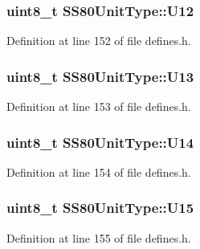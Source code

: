 \subsubsection[{\texorpdfstring{U12}{U12}}]{\setlength{\rightskip}{0pt plus 5cm}uint8\+\_\+t S\+S80\+Unit\+Type\+::\+U12}\hypertarget{structSS80UnitType_a03dbef211d4dfa850c9795ca4e60a104}{}\label{structSS80UnitType_a03dbef211d4dfa850c9795ca4e60a104}


Definition at line 152 of file defines.\+h.

\subsubsection[{\texorpdfstring{U13}{U13}}]{\setlength{\rightskip}{0pt plus 5cm}uint8\+\_\+t S\+S80\+Unit\+Type\+::\+U13}\hypertarget{structSS80UnitType_ac890c3734ea6988e504d71491d48f804}{}\label{structSS80UnitType_ac890c3734ea6988e504d71491d48f804}


Definition at line 153 of file defines.\+h.

\subsubsection[{\texorpdfstring{U14}{U14}}]{\setlength{\rightskip}{0pt plus 5cm}uint8\+\_\+t S\+S80\+Unit\+Type\+::\+U14}\hypertarget{structSS80UnitType_a885f26cbcfaf7b80ce64f069401fad7d}{}\label{structSS80UnitType_a885f26cbcfaf7b80ce64f069401fad7d}


Definition at line 154 of file defines.\+h.

\subsubsection[{\texorpdfstring{U15}{U15}}]{\setlength{\rightskip}{0pt plus 5cm}uint8\+\_\+t S\+S80\+Unit\+Type\+::\+U15}\hypertarget{structSS80UnitType_a088eee3da613c988c4f81c2ec57818de}{}\label{structSS80UnitType_a088eee3da613c988c4f81c2ec57818de}


Definition at line 155 of file defines.\+h.


